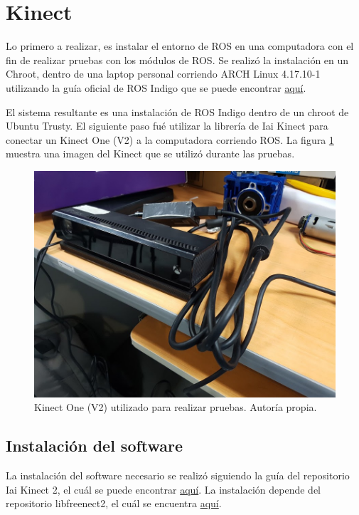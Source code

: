 \newpage

\section{Kinect}
Lo primero a realizar, es instalar el entorno de ROS en una computadora con el fin de realizar pruebas con los módulos de ROS. Se realizó la instalación en un Chroot, dentro de una laptop personal corriendo ARCH Linux 4.17.10-1 utilizando la guía oficial de ROS Indigo que se puede encontrar \href{http://wiki.ros.org/ROS/Tutorials/InstallingIndigoInChroot}{aquí}.

El sistema resultante es una instalación de ROS Indigo dentro de un chroot de Ubuntu Trusty. El siguiente paso fué utilizar la librería de Iai Kinect \cite{iai_kinect2} para conectar un Kinect One (V2) a la computadora corriendo ROS. La figura \ref{F:kinect} muestra una imagen del Kinect que se utilizó durante las pruebas.

\begin{figure}[H]
\centering
\includegraphics[scale=0.4]{imagenes/kinect.jpg}
\caption{Kinect One (V2) utilizado para realizar pruebas. Autoría propia.}
\label{F:kinect}
\end{figure}

\subsection{Instalación del software}

La instalación del software necesario se realizó siguiendo la guía del repositorio Iai Kinect 2, el cuál se puede encontrar \href{https://github.com/code-iai/iai_kinect2}{aquí}. La instalación depende del repositorio libfreenect2, el cuál se encuentra \href{https://github.com/OpenKinect/libfreenect2}{aquí}.

